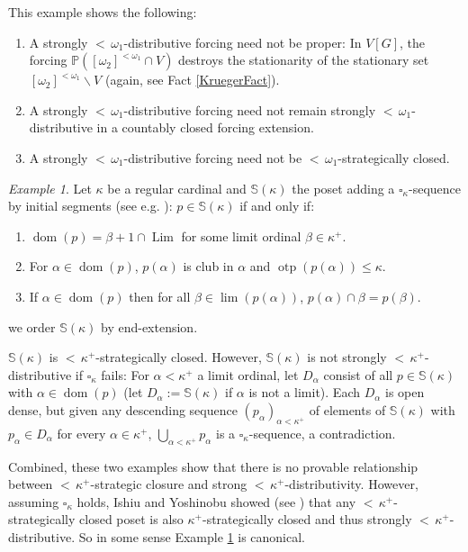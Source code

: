 \documentclass[12pt]{amsart}
\theoremstyle{definition}
\theoremstyle{remark}
\newtheorem{myex}[mydef]{Example}
\theoremstyle{plain}
\numberwithin{mydef}{section}
\DeclareMathOperator{\dom}{dom}
\DeclareMathOperator{\otp}{otp}
\DeclareMathOperator{\Lim}{Lim}
\newcommand{\dP}{\mathbb{P}}
\newcommand{\dS}{\mathbb{S}}
\begin{document}
	This example shows the following:
	
	\begin{enumerate}
		\item A strongly ${<}\,\omega_1$-distributive forcing need not be proper: In $V[G]$, the forcing $\dP([\omega_2]^{<\omega_1}\cap V)$ destroys the stationarity of the stationary set $[\omega_2]^{<\omega_1}\smallsetminus V$ (again, see Fact \ref{KruegerFact}).
		\item A strongly ${<}\,\omega_1$-distributive forcing need not remain strongly ${<}\,\omega_1$-distributive in a countably closed forcing extension.
		\item A strongly ${<}\,\omega_1$-distributive forcing need not be ${<}\,\omega_1$-strategically closed.
	\end{enumerate}
	
	\begin{myex}\label{Example2}
		Let $\kappa$ be a regular cardinal and $\dS(\kappa)$ the poset adding a $\square_{\kappa}$-sequence by initial segments (see e.g. \cite[Example 6.6]{CummingsHandbook}): $p\in\dS(\kappa)$ if and only if:
		\begin{enumerate}
			\item $\dom(p)=\beta+1\cap\Lim$ for some limit ordinal $\beta\in\kappa^+$.
			\item For $\alpha\in\dom(p)$, $p(\alpha)$ is club in $\alpha$ and $\otp(p(\alpha))\leq\kappa$.
			\item If $\alpha\in\dom(p)$ then for all $\beta\in\lim(p(\alpha))$, $p(\alpha)\cap\beta= p(\beta)$.
		\end{enumerate}
		we order $\dS(\kappa)$ by end-extension.
		
		$\dS(\kappa)$ is ${<}\,\kappa^+$-strategically closed. However, $\dS(\kappa)$ is not strongly ${<}\,\kappa^+$-distributive if $\square_{\kappa}$ fails: For $\alpha<\kappa^+$ a limit ordinal, let $D_{\alpha}$ consist of all $p\in\dS(\kappa)$ with $\alpha\in\dom(p)$ (let $D_{\alpha}:=\dS(\kappa)$ if $\alpha$ is not a limit). Each $D_{\alpha}$ is open dense, but given any descending sequence $(p_{\alpha})_{\alpha<\kappa^+}$ of elements of $\dS(\kappa)$ with $p_{\alpha}\in D_{\alpha}$ for every $\alpha\in\kappa^+$, $\bigcup_{\alpha<\kappa^+}p_{\alpha}$ is a $\square_{\kappa}$-sequence, a contradiction.
	\end{myex}
	
	Combined, these two examples show that there is no provable relationship between ${<}\,\kappa^+$-strategic closure and strong ${<}\,\kappa^+$-distributivity. However, assuming $\square_{\kappa}$ holds, Ishiu and Yoshinobu showed (see \cite[Theorem 3.3]{IshiuYoshinobuDirectiveTreesGamesPosets}) that any ${<}\,\kappa^+$-strategically closed poset is also $\kappa^+$-strategically closed and thus strongly ${<}\,\kappa^+$-distributive. So in some sense Example \ref{Example2} is canonical.
	
\end{document}
